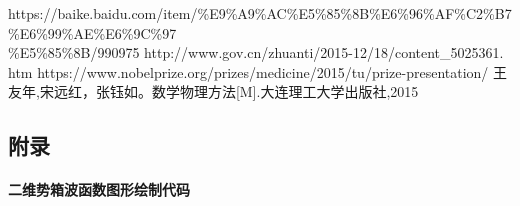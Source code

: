 \documentclass[12pt, a4paper, oneside]{ctexart}
\newcounter{problemname}
\newenvironment{note}{\par\noindent\textbf{题目\arabic{problemname}的注记. }}{\\\par}
\begin{document}

\newpage

\begin{thebibliography}{99}

    https://baike.baidu.com/item/\%E9\%A9\%AC\%E5\%85\%8B\%E6\%96\%AF\%C2\%B7\%E6\%99\%AE\%E6\%9C\%97 \\ \%E5\%85\%8B/990975
    http://www.gov.cn/zhuanti/2015-12/18/content\_5025361. htm
    https://www.nobelprize.org/prizes/medicine/2015/tu/prize-presentation/
    王友年,宋远红，张钰如。数学物理方法[M].大连理工大学出版社,2015
\end{thebibliography}

\newpage




\begin{appendices}
    \renewcommand{\thesection}{\Alph{section}}
    \section{附录}
    \paragraph{二维势箱波函数图形绘制代码}
    
    \begin{lstlisting}
        
    \end{lstlisting}
\end{appendices}
\end{document}
